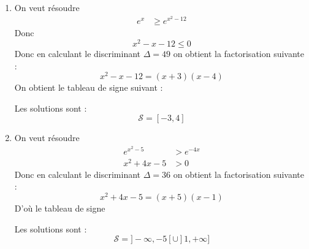 \documentclass[12pt,fleqn]{report} %
\begin{document}
\begin{correction}
\begin{enumerate}
		\item 
		On veut résoudre
		\begin{align*}
		e^x & \geq e^{x^2-12}
		\end{align*}
		Donc \[
		x^2 - x -12 \leq 0
		\]
		Donc en calculant le discriminant $\Delta = 49$ on obtient la factorisation suivante :
		\[
		x^2 - x - 12 = (x+3)(x-4)
		\]
		On obtient le tableau de signe suivant : 
		\begin{center}
		\end{center}
		Les solutions sont :
		\[
		\mathcal{S} = [-3,4]
		\]
		
		\item 
		On veut résoudre
		\begin{align*}
		e^{x^2-5} & >e^{-4x}\\
		x^2+4x-5&> 0
		\end{align*}
		Donc en calculant le discriminant $\Delta = 36$ on obtient la factorisation suivante :
		\[
		x^2 + 4x - 5 = (x+5)(x-1)
		\]
		D'où le tableau de signe
		\begin{center}
		\end{center}
		Les solutions sont :
		\[
		\mathcal{S} = ]-\infty,-5[ \cup ]1,+\infty]
		\]
		
	\end{enumerate}
\end{correction}
\end{document}
